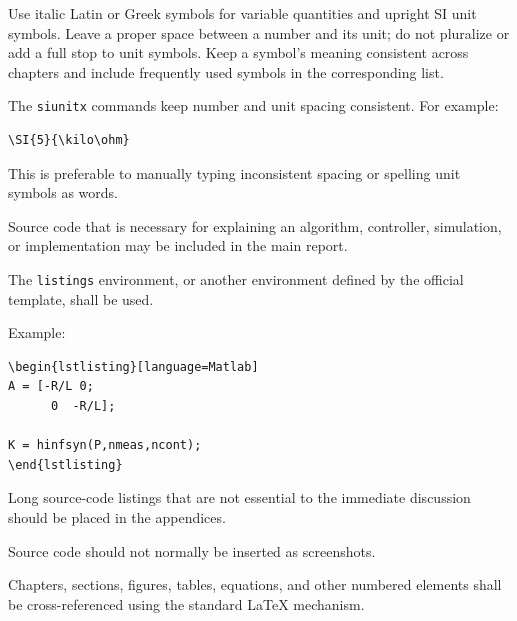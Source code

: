 {Use italic Latin or Greek symbols for variable quantities and upright
SI unit symbols. Leave a proper space between a number and its unit;
do not pluralize or add a full stop to unit symbols. Keep a symbol's
meaning consistent across chapters and include frequently used
symbols in the corresponding list.

\RegExample The \verb|siunitx| commands keep number and unit spacing
consistent. For example:

\begin{verbatim}
\SI{5}{\kilo\ohm}
\end{verbatim}

This is preferable to manually typing inconsistent spacing or
spelling unit symbols as words.

\vspace{0.3cm}



Source code that is necessary for explaining an algorithm,
controller, simulation, or implementation may be included in the
main report.

The \verb|listings| environment, or another environment defined by
the official template, shall be used.

Example:

\begin{verbatim}
\begin{lstlisting}[language=Matlab]
A = [-R/L 0;
      0  -R/L];

K = hinfsyn(P,nmeas,ncont);
\end{lstlisting}
\end{verbatim}

Long source-code listings that are not essential to the immediate
discussion should be placed in the appendices.

Source code should not normally be inserted as screenshots.

\vspace{0.3cm}



Chapters, sections, figures, tables, equations, and other numbered
elements shall be cross-referenced using the standard \LaTeX{}
mechanism.

}
